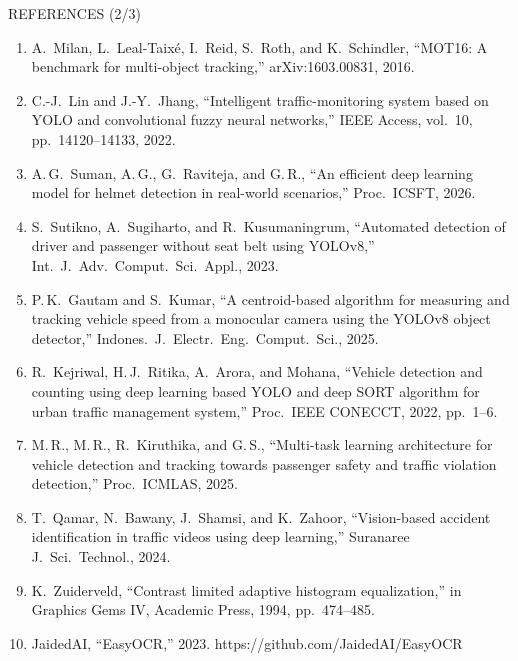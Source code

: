 \documentclass[aspectratio=169,10pt,t]{beamer}
\begin{document}
\begin{frame}{REFERENCES (2/3)}
\scriptsize
\begin{enumerate}\setlength{\itemsep}{0.05em}
\item[{[11]}] A.\ Milan, L.\ Leal-Taix\'e, I.\ Reid, S.\ Roth, and K.\ Schindler, ``MOT16: A benchmark for multi-object tracking,'' arXiv:1603.00831, 2016.
\item[{[12]}] C.-J.\ Lin and J.-Y.\ Jhang, ``Intelligent traffic-monitoring system based on YOLO and convolutional fuzzy neural networks,'' IEEE Access, vol.\ 10, pp.\ 14120--14133, 2022.
\item[{[13]}] A.\,G.\ Suman, A.\,G., G.\ Raviteja, and G.\,R., ``An efficient deep learning model for helmet detection in real-world scenarios,'' Proc.\ ICSFT, 2026.
\item[{[14]}] S.\ Sutikno, A.\ Sugiharto, and R.\ Kusumaningrum, ``Automated detection of driver and passenger without seat belt using YOLOv8,'' Int.\ J.\ Adv.\ Comput.\ Sci.\ Appl., 2023.
\item[{[15]}] P.\,K.\ Gautam and S.\ Kumar, ``A centroid-based algorithm for measuring and tracking vehicle speed from a monocular camera using the YOLOv8 object detector,'' Indones.\ J.\ Electr.\ Eng.\ Comput.\ Sci., 2025.
\item[{[16]}] R.\ Kejriwal, H.\,J.\ Ritika, A.\ Arora, and Mohana, ``Vehicle detection and counting using deep learning based YOLO and deep SORT algorithm for urban traffic management system,'' Proc.\ IEEE CONECCT, 2022, pp.\ 1--6.
\item[{[17]}] M.\,R., M.\,R., R.\ Kiruthika, and G.\,S., ``Multi-task learning architecture for vehicle detection and tracking towards passenger safety and traffic violation detection,'' Proc.\ ICMLAS, 2025.
\item[{[18]}] T.\ Qamar, N.\ Bawany, J.\ Shamsi, and K.\ Zahoor, ``Vision-based accident identification in traffic videos using deep learning,'' Suranaree J.\ Sci.\ Technol., 2024.
\item[{[19]}] K.\ Zuiderveld, ``Contrast limited adaptive histogram equalization,'' in Graphics Gems IV, Academic Press, 1994, pp.\ 474--485.
\item[{[20]}] JaidedAI, ``EasyOCR,'' 2023. https://github.com/JaidedAI/EasyOCR
\end{enumerate}
\end{frame}
\end{document}
